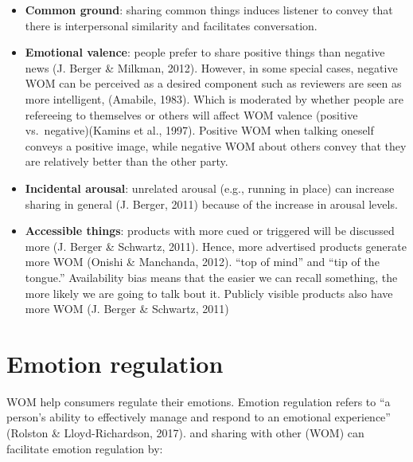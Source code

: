 \documentclass[
]{book}
\begin{document}
\begin{itemize}
\item
  \textbf{Common ground}: sharing common things induces listener to convey that there is interpersonal similarity and facilitates conversation.\\
\item
  \textbf{Emotional valence}: people prefer to share positive things than negative news (J. Berger \& Milkman, 2012). However, in some special cases, negative WOM can be perceived as a desired component such as reviewers are seen as more intelligent, (Amabile, 1983). Which is moderated by whether people are refereeing to themselves or others will affect WOM valence (positive vs.~negative)(Kamins et al., 1997). Positive WOM when talking oneself conveys a positive image, while negative WOM about others convey that they are relatively better than the other party.\\
\item
  \textbf{Incidental arousal}: unrelated arousal (e.g., running in place) can increase sharing in general (J. Berger, 2011) because of the increase in arousal levels.\\
\item
  \textbf{Accessible things}: products with more cued or triggered will be discussed more (J. Berger \& Schwartz, 2011). Hence, more advertised products generate more WOM (Onishi \& Manchanda, 2012). ``top of mind'' and ``tip of the tongue.'' Availability bias means that the easier we can recall something, the more likely we are going to talk bout it. Publicly visible products also have more WOM (J. Berger \& Schwartz, 2011)
\end{itemize}

\hypertarget{emotion-regulation}{%
\section{Emotion regulation}\label{emotion-regulation}}

WOM help consumers regulate their emotions. Emotion regulation refers to ``a person's ability to effectively manage and respond to an emotional experience'' (Rolston \& Lloyd-Richardson, 2017). and sharing with other (WOM) can facilitate emotion regulation by:
\end{document}
